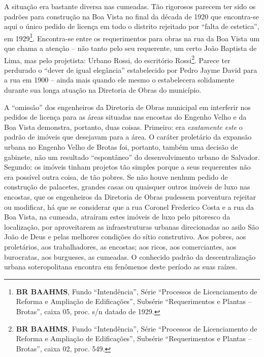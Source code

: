 A situação era bastante diversa nas cumeadas. Tão rigorosos parecem ter sido os padrões para construção na Boa Vista no final da década de 1920 que encontra-se aqui o único pedido de licença em todo o distrito rejeitado por ``falta de estetica'', em 1929\footnote{\textbf{BR BAAHMS}, Fundo ``Intendência'', Série ``Processos de Licenciamento de Reforma e Ampliação de Edificações'', Subsérie ``Requerimentos e Plantas -- Brotas'', caixa 05, proc. s/n datado de 1929.}. Encontra-se entre os requerimentos para obras na rua da Boa Vista um que chama a atenção -- não tanto pelo seu requerente, um certo João Baptista de Lima, mas pelo projetista: Urbano Rossi, do escritório Rossi\footnote{\textbf{BR BAAHMS}, Fundo ``Intendência'', Série ``Processos de Licenciamento de Reforma e Ampliação de Edificações'', Subsérie ``Requerimentos e Plantas -- Brotas'', caixa 02, proc. 549.}. Parece ter perdurado o ``dever de igual elegância'' estabelecido por Pedro Jayme David para a rua em 1900 -- ainda mais quando ele mesmo o estabelecera solidamente durante sua longa atuação na Diretoria de Obras do município.

A ``omissão'' dos engenheiros da Diretoria de Obras municipal em interferir nos pedidos de licença para as áreas situadas nas encostas do Engenho Velho e da Boa Vista demonstra, portanto, duas coisas. Primeiro: era \textit{exatamente este} o padrão de imóveis que desejavam para a área. O caráter proletário da expansão urbana no Engenho Velho de Brotas foi, portanto, também uma decisão de gabinete, não um resultado ``espontâneo'' do desenvolvimento urbano de Salvador. Segundo: os imóveis tinham projetos tão simples porque a seus requerentes não era possível outra coisa, de tão pobres. Se não houve nenhum pedido de construção de palacetes, grandes casas ou quaisquer outros imóveis de luxo nas encostas, que os engenheiros da Diretoria de Obras pudessem porventura rejeitar ou modificar, há que se considerar que a rua Coronel Frederico Costa e a rua da Boa Vista, na cumeada, atraíram estes imóveis de luxo pelo pitoresco da localização, por aproveitarem as infraestruturas urbanas direcionadas ao asilo São João de Deus e pelas melhores condições do sítio construtivo. Aos pobres, aos proletários, aos trabalhadores, as encostas; aos ricos, aos comerciantes, aos burocratas, aos burgueses, as cumeadas. O conhecido padrão da descentralização urbana soteropolitana encontra em fenômenos deste período as suas raízes.


